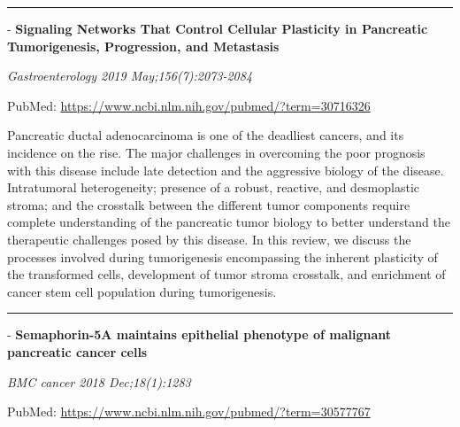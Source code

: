 \documentclass[]{article}
\begin{document}
\begin{center}\rule{0.5\linewidth}{\linethickness}\end{center}

 - \textbf{Signaling Networks That Control Cellular Plasticity in
Pancreatic Tumorigenesis, Progression, and Metastasis}

\emph{Gastroenterology 2019 May;156(7):2073-2084}

PubMed: \url{https://www.ncbi.nlm.nih.gov/pubmed/?term=30716326}

Pancreatic ductal adenocarcinoma is one of the deadliest cancers, and
its incidence on the rise. The major challenges in overcoming the poor
prognosis with this disease include late detection and the aggressive
biology of the disease. Intratumoral heterogeneity; presence of a
robust, reactive, and desmoplastic stroma; and the crosstalk between the
different tumor components require complete understanding of the
pancreatic tumor biology to better understand the therapeutic challenges
posed by this disease. In this review, we discuss the processes involved
during tumorigenesis encompassing the inherent plasticity of the
transformed cells, development of tumor stroma crosstalk, and enrichment
of cancer stem cell population during tumorigenesis.

{}

{}

\begin{center}\rule{0.5\linewidth}{\linethickness}\end{center}

 - \textbf{Semaphorin-5A maintains epithelial phenotype of malignant
pancreatic cancer cells}

\emph{BMC cancer 2018 Dec;18(1):1283}

PubMed: \url{https://www.ncbi.nlm.nih.gov/pubmed/?term=30577767}
\end{document}
